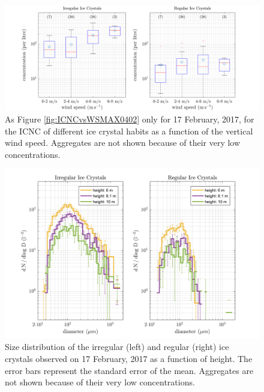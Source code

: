 \documentclass[draft,linenumbers]{agujournal}
\begin{document}
\begin{figure}[t]
 \centering
 	\includegraphics[width=14cm]{1702_habitswWS.png}
 \caption{As Figure \ref{fig:ICNCvsWSMAX0402} only for 17 February, 2017, for the ICNC of different ice crystal habits as a function of the vertical wind speed. Aggregates are not shown because of their very low concentrations.}
 \label{fig:ICNCvsWindHabits1702}
\end{figure}

\begin{figure}[t]
 \centering
 	\includegraphics[width=14cm]{1702_habitswSpectrum.png}
 \caption{Size distribution of the irregular (left) and regular (right) ice crystals observed on 17 February, 2017 as a function of height. The error bars represent the standard error of the mean. Aggregates are not shown because of their very low concentrations.}
 \label{fig:spectrum17}
\end{figure}
\end{document}
